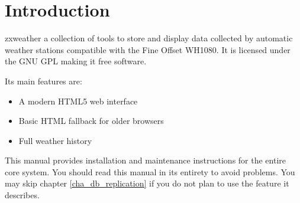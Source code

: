 \documentclass[a4paper,10pt,draft]{book}
\newcommand{\partnumber}{\ifthenelse{\isundefined{\projectnum}}{}{\projectnum-\docnum	\ifthenelse{\equal{\docrev}{001}}{}{.\docrev}}}
\begin{document}

\ifthenelse{\isundefined{\ordernumber}}{

\title{\doctitle{} - \docsubtitle}
\author{\docauthor}
}{

\title{\doctitle}
\subtitle{\docsubtitle}
\titleabstract{\docabstract}
\ordernumber{\partnumber}
\updateinfo{\docupdateinfo}
\osinfo{\docosver}
\swversion{\docswver}
\titlecopyright{\doccopyright}
\licensestatement{\doclicense}
}
\date{\docdate}

\maketitle

\clearpage

\tableofcontents
\clearpage



\chapter{Introduction}
\setcounter{page}{1}

zxweather a collection of tools to store and display data collected by automatic weather stations compatible with the Fine Offset WH1080. It is licensed under the GNU GPL making it free software.

Its main features are:
\begin{itemize}
\item A modern HTML5 web interface
\item Basic HTML fallback for older browsers
\item Full weather history
\end{itemize}

This manual provides installation and maintenance instructions for the entire core system. You should read this manual in its entirety to avoid problems. You may skip chapter \ref{cha_db_replication} if you do not plan to use the feature it describes.
\end{document}
